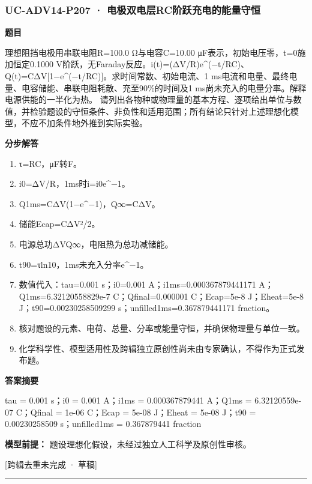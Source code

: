 \documentclass[UTF8,11pt,a4paper]{ctexart}
\begin{document}
\subsubsection*{UC-ADV14-P207 · 电极双电层RC阶跃充电的能量守恒}
\noindent\textbf{题目}\par
理想阻挡电极用串联电阻R=100.0 Ω与电容C=10.00 μF表示，初始电压零，t=0施加恒定0.1000 V阶跃，无Faraday反应。i(t)=(ΔV/R)e\textasciicircum{}(−t/RC)、Q(t)=CΔV[1−e\textasciicircum{}(−t/RC)]。求时间常数、初始电流、1 ms电流和电量、最终电量、电容储能、串联电阻耗散、充至90\%的时间及1 ms尚未充入的电量分率。解释电源供能的一半化为热。 请列出各物种或物理量的基本方程、逐项给出单位与数值，并检验题设的守恒条件、非负性和适用范围；所有结论只针对上述理想化模型，不应不加条件地外推到实际实验。\par
\medskip\noindent\textbf{分步解答}
\begin{enumerate}
\item τ=RC，μF转F。
\item i0=ΔV/R，1ms时i=i0e\textasciicircum{}−1。
\item Q1ms=CΔV(1−e\textasciicircum{}−1)，Q∞=CΔV。
\item 储能Ecap=CΔV²/2。
\item 电源总功ΔVQ∞，电阻热为总功减储能。
\item t90=τln10，1ms未充入分率e\textasciicircum{}−1。
\item 数值代入：tau=0.001 s；i0=0.001 A；i1ms=0.000367879441171 A；Q1ms=6.32120558829e-7 C；Qfinal=0.000001 C；Ecap=5e-8 J；Eheat=5e-8 J；t90=0.00230258509299 s；unfilled1ms=0.367879441171 fraction。
\item 核对题设的元素、电荷、总量、分率或能量守恒，并确保物理量与单位一致。
\item 化学科学性、模型适用性及跨辑独立原创性尚未由专家确认，不得作为正式发布题。
\end{enumerate}
\noindent\textbf{答案摘要}\par
tau = 0.001 s；i0 = 0.001 A；i1ms = 0.000367879441 A；Q1ms = 6.32120559e-07 C；Qfinal = 1e-06 C；Ecap = 5e-08 J；Eheat = 5e-08 J；t90 = 0.00230258509 s；unfilled1ms = 0.367879441 fraction\par
\noindent\textbf{模型前提：}
题设理想化假设，未经过独立人工科学及原创性审核。\par
\noindent\textcolor{red!65!black}{[跨辑去重未完成 · 草稿]} \par
\medskip\hrule\medskip
{}
\end{document}
